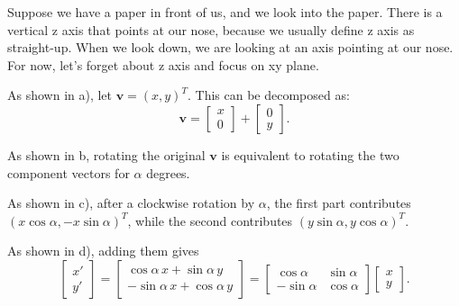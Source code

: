 \documentclass[10pt]{article}
\newcommand{\vect}[1]{\boldsymbol{#1}}
\begin{document}
\begin{center}
\end{center}

Suppose we have a paper in front of us, and we look into the paper. There is a vertical z axis that points at our nose, because we usually define z axis as straight-up. When we look down, we are looking at an axis pointing at our nose. For now, let's forget about z axis and focus on xy plane.


As shown in a), let $\vect v=(x,y)^T$. This can be decomposed as:
\[
  \vect v=\begin{bmatrix}x\\0\end{bmatrix}
          +\begin{bmatrix}0\\y\end{bmatrix}.
\]

As shown in b, rotating the original $\vect v$ is equivalent to rotating the two component vectors for $\alpha$ degrees.


As shown in c), after a clockwise rotation by $\alpha$, the first part contributes
$(x\cos\alpha,-x\sin\alpha)^T$, while the second contributes
$(y\sin\alpha,y\cos\alpha)^T$.  

As shown in d), adding them gives
\[
 \begin{bmatrix}x'\\y'\end{bmatrix}
 =\begin{bmatrix}
     \cos\alpha\,x+  \sin\alpha\,y\\
    -\sin\alpha\,x+ \cos\alpha\,y
   \end{bmatrix}
 =\begin{bmatrix}
     \cos\alpha & \sin\alpha\\
    -\sin\alpha & \cos\alpha
   \end{bmatrix}
   \begin{bmatrix}x\\y\end{bmatrix}.
\]
\end{document}
